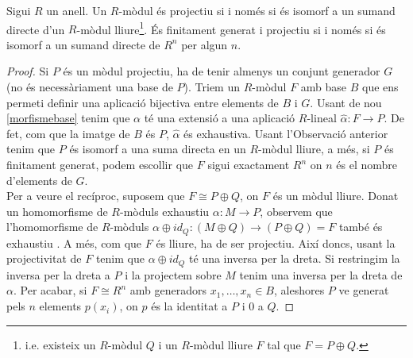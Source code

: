 \begin{theorem} \label{carProj}
Sigui $R$ un anell. Un $R$-mòdul és projectiu si i només si és isomorf a un sumand directe d'un $R$-mòdul lliure\footnote{i.e. existeix un $R$-mòdul $Q$ i un $R$-mòdul lliure $F$ tal que $F = P \oplus Q$.}. És finitament generat i projectiu si i només si és isomorf a un sumand directe de $R^n$ per algun $n$.
\end{theorem}

\begin{proof}Si $P$ és un mòdul projectiu, ha de tenir almenys un conjunt generador $G$ (no és necessàriament una base de $P$). Triem un $R$-mòdul $F$ amb base $B$ que ens permeti definir una aplicació bijectiva entre elements de $B$ i $G$. Usant de nou \ref{morfismebase} tenim que $\alpha$ té una extensió a una aplicació $R$-lineal $\hat{\alpha}: F\rightarrow P$. De fet, com que la imatge de $B$ és $P$, $\hat{\alpha}$ és exhaustiva. Usant l'Observació anterior tenim que $P$ és isomorf a una suma directa en un $R$-mòdul lliure, a més, si $P$ és finitament generat, podem escollir que $F$ sigui exactament $R^n$ on $n$ és el nombre d'elements de $G$.
\\
Per a veure el recíproc, suposem que $F\cong P\oplus Q$, on $F$ és un mòdul lliure. Donat un homomorfisme de $R$-mòduls exhaustiu $\alpha : M \rightarrow P$, observem que l'homomorfisme de $R$-mòduls $\alpha \oplus id_Q:(M\oplus Q)\rightarrow (P\oplus Q)=F$ també és exhaustiu . A més, com que $F$ és lliure, ha de ser projectiu. Així doncs, usant la projectivitat de $F$ tenim que $\alpha \oplus id_Q$ té una inversa per la dreta. Si restringim la inversa per la dreta a $P$ i la projectem sobre $M$ tenim una inversa per la dreta de $\alpha$. Per acabar, si $F\cong R^n$ amb generadors $x_1,\dots, x_n \in B$, aleshores $P$ ve generat pels $n$ elements $p(x_i)$, on $p$ és la identitat a $P$ i $0$ a $Q$.
\end{proof}

